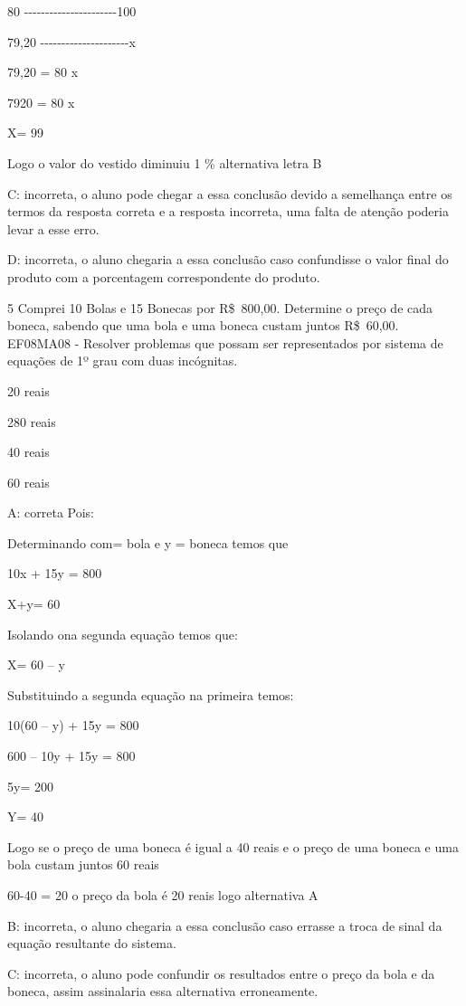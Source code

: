 80 -\/-\/-\/-\/-\/-\/-\/-\/-\/-\/-\/-\/-\/-\/-\/-\/-\/-\/-\/-\/-\/-100

79,20 -\/-\/-\/-\/-\/-\/-\/-\/-\/-\/-\/-\/-\/-\/-\/-\/-\/-\/-\/-\/-x

79,20 = 80 x

7920 = 80 x

X= 99

Logo o valor do vestido diminuiu 1 \% alternativa letra B

C: incorreta, o aluno pode chegar a essa conclusão devido a semelhança
entre os termos da resposta correta e a resposta incorreta, uma falta de
atenção poderia levar a esse erro.

D: incorreta, o aluno chegaria a essa conclusão caso confundisse o valor
final do produto com a porcentagem correspondente do produto.

\num{5} Comprei 10 Bolas e 15 Bonecas por R\$~800,00. Determine o preço de
cada boneca, sabendo que uma bola e uma boneca custam juntos R\$~60,00.
EF08MA08 - Resolver problemas que possam ser representados por sistema
de equações de 1º grau com duas incógnitas.

\item 20 reais
\item 280 reais
\item 40 reais
\item 60 reais

A: correta Pois:

Determinando com\times = bola e y = boneca temos que

10x + 15y = 800

X+y= 60

Isolando o\times na segunda equação temos que:

X= 60 -- y

Substituindo a segunda equação na primeira temos:

10(60 -- y) + 15y = 800

600 -- 10y + 15y = 800

5y= 200

Y= 40

Logo se o preço de uma boneca é igual a 40 reais e o preço de uma boneca
e uma bola custam juntos 60 reais

60-40 = 20 o preço da bola é 20 reais logo alternativa A

B: incorreta, o aluno chegaria a essa conclusão caso errasse a troca de
sinal da equação resultante do sistema.

C: incorreta, o aluno pode confundir os resultados entre o preço da bola
e da boneca, assim assinalaria essa alternativa erroneamente.

